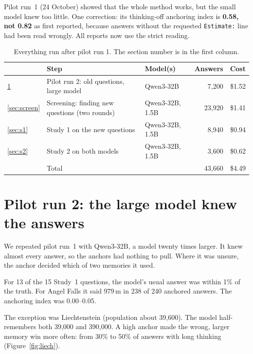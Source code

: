 \documentclass[11pt,a4paper]{article}
\begin{document}
Pilot run~1 (24 October) showed that the whole method works, but the small model knew too little. One correction: its thinking-off anchoring index is \textbf{0.58, not 0.82} as first reported, because answers without the requested \texttt{Estimate:} line had been read wrongly. All reports now use the strict reading.

\begin{table}[ht]
\centering\small
\begin{tabular}{@{}lp{6cm}p{3.2cm}rr@{}}
\toprule
& Step & Model(s) & Answers & Cost \\
\midrule
\ref{sec:run2} & Pilot run 2: old questions, large model & Qwen3-32B & 7,200 & \$1.52 \\
\ref{sec:screen} & Screening: finding new questions (two rounds) & Qwen3-32B, 1.5B & 23,920 & \$1.41 \\
\ref{sec:s1} & Study 1 on the new questions & Qwen3-32B, 1.5B & 8,940 & \$0.94 \\
\ref{sec:s2} & Study 2 on both models & Qwen3-32B, 1.5B & 3,600 & \$0.62 \\
\midrule
& Total & & 43,660 & \$4.49 \\
\bottomrule
\end{tabular}
\caption{Everything run after pilot run 1. The section number is in the first column.}
\end{table}

\section{Pilot run 2: the large model knew the answers}
\label{sec:run2}

\begin{inshort}
We repeated pilot run~1 with Qwen3-32B, a model twenty times larger. It knew almost every answer, so the anchors had nothing to pull. Where it was unsure, the anchor decided which of two memories it used.
\end{inshort}

For 13 of the 15 Study~1 questions, the model's usual answer was within 1\% of the truth. For Angel Falls it said 979\,m in 238 of 240 anchored answers. The anchoring index was 0.00--0.05.

The exception was Liechtenstein (population about 39,600). The model half-remembers both 39,000 and 390,000. A high anchor made the wrong, larger memory win more often: from 30\% to 50\% of answers with long thinking (Figure~\ref{fig:liech}).
\end{document}

